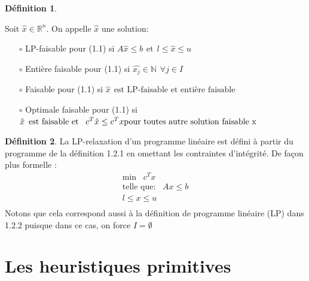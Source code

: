 \documentclass[12pt,a4paper,oneside]{book}
\theoremstyle{definition}
\newtheorem{definition}{Définition}[section]
\newcommand{\R}{\mathbb{R}}
\newcommand{\N}{\mathbb{N}}
\begin{document}
	\begin{definition} \ 
		
		Soit $\hat{x} \in \R^n$. On appelle $\hat{x}$ une solution:\\
		\begin{itemize}
			\item[$\circ$] LP-faisable pour (1.1) si $A\hat{x} \leq b \hspace{5pt} \text{et} \hspace{5pt} l \leq \hat{x} \leq u$ 
			\item[$\circ$] Entière faisable pour (1.1) si $\hat{x_j} \in \N \hspace{5pt} \forall j \in I$ 
			\item[$\circ$] Faisable pour (1.1) si $\hat{x}\hspace{5pt} \text{est LP-faisable et entière faisable} $ 
			\item[$\circ$] Optimale faisable pour (1.1) si $\hat{x} \hspace{5pt} \text{est faisable et } \hspace{5pt} c^T\hat{x} \leq c^Tx \hspace{5pt}\\
			\text{pour toutes autre solution faisable x}$
		\end{itemize}
		
	\end{definition}

	\begin{definition}
		La LP-relaxation d’un programme linéaire est défini à partir du programme de la définition 1.2.1 en omettant les contraintes d’intégrité. De façon plus formelle :
		\begin{equation}
			\begin{aligned}
				\text{min} \hspace{10pt}  c^T x \\
				\text{telle que:} \hspace{10pt} Ax \leq b \\ 
				l \leq x \leq u \\
			\end{aligned} 
		\end{equation}
		Notons que cela correspond aussi à la définition de programme linéaire (LP) dans 1.2.2 puisque dans ce cas, on force $I = \emptyset$
		
	\end{definition}


	\section{Les heuristiques primitives}
\end{document}
